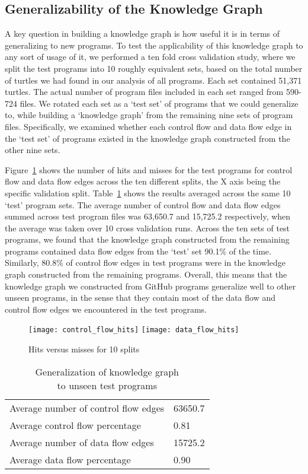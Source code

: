 \subsection{Generalizability of the Knowledge Graph}
A key question in building a knowledge graph is how useful it is in terms of generalizing to new programs.  To test the applicability of this knowledge graph to any sort of usage of it, we performed a ten fold cross validation study, where we split the test programs into 10 roughly equivalent sets, based on the total number of turtles we had found in our analysis of all programs.  Each set contained 51,371 turtles.  The actual number of program files included in each set ranged from 590-724 files.  We rotated each set as a `test set' of programs that we could generalize to, while building a `knowledge graph' from the remaining nine sets of program files.  Specifically, we examined whether each control flow and data flow edge in the `test set' of programs existed in the knowledge graph constructed from the other nine sets.  

Figure~\ref{hits_misses} shows the number of hits and misses for the test programs for control flow and data flow edges across the ten different splits, the X axis being the specific validation split.  Table~\ref{cross_validation_results} shows the results averaged across the same 10 `test' program sets.  The average number of control flow and data flow edges summed across test program files was 63,650.7 and 15,725.2 respectively, when the average was taken over 10 cross validation runs.  Across the ten sets of test programs, we found that the knowledge graph constructed from the remaining programs contained data flow edges from the `test' set 90.1\% of the time.  Similarly, 80.8\% of control flow edges in test programs were in the knowledge graph constructed from the remaining programs.  Overall, this means that the knowledge graph we constructed from GitHub programs generalize well to other unseen programs, in the sense that they contain most of the data flow and control flow edges we encountered in the test programs.

\begin{figure}
\centering
{\texttt{[image: control\_flow\_hits]}}%
\hfill
{\texttt{[image: data\_flow\_hits]}}%
\caption{Hits versus misses for 10 splits}
\label{hits_misses}
\end{figure}


\begin{table}
\begin{center}
\begin{tabular}{ |l|l|} 
 \hline
Average number of control flow edges & 63650.7 \\
Average control flow percentage & 0.81 \\ \hline
Average number of data flow edges & 15725.2 \\
Average data flow percentage & 0.90 \\ \hline
\end{tabular}
\end{center}
\caption{Generalization of knowledge graph\\
to unseen test programs}
\label{cross_validation_results}
\end{table}


